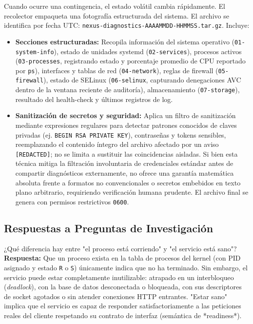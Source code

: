\documentclass[10pt,a4paper]{article}
\begin{document}
Cuando ocurre una contingencia, el estado volátil cambia rápidamente. El recolector empaqueta una fotografía estructurada del sistema. El archivo se identifica por fecha UTC: \nolinkurl{nexus-diagnostics-AAAAMMDD-HHMMSS.tar.gz}. Incluye:
\begin{itemize}[leftmargin=*]
    \item \textbf{Secciones estructuradas:} Recopila información del sistema operativo (\texttt{01-system-info}), estado de unidades systemd (\texttt{02-services}), procesos activos (\texttt{03-processes}, registrando estado y porcentaje promedio de CPU reportado por \texttt{ps}), interfaces y tablas de red (\texttt{04-network}), reglas de firewall (\texttt{05-firewall}), estado de SELinux (\texttt{06-selinux}, capturando denegaciones AVC dentro de la ventana reciente de auditoría), almacenamiento (\texttt{07-storage}), resultado del health-check y últimos registros de log.
    \item \textbf{Sanitización de secretos y seguridad:} Aplica un filtro de sanitización mediante expresiones regulares para detectar patrones conocidos de claves privadas (ej. \texttt{BEGIN RSA PRIVATE KEY}), contraseñas y tokens sensibles, reemplazando el contenido íntegro del archivo afectado por un aviso \texttt{[REDACTED]}; no se limita a sustituir las coincidencias aisladas. Si bien esta técnica mitiga la filtración involuntaria de credenciales estándar antes de compartir diagnósticos externamente, no ofrece una garantía matemática absoluta frente a formatos no convencionales o secretos embebidos en texto plano arbitrario, requiriendo verificación humana prudente. El archivo final se genera con permisos restrictivos \texttt{0600}.
\end{itemize}

\subsection{Respuestas a Preguntas de Investigación}

\begin{pregunta}{¿Qué diferencia hay entre "el proceso está corriendo" y "el servicio está sano"?}
    \textbf{Respuesta:} Que un proceso exista en la tabla de procesos del kernel (con PID asignado y estado \texttt{R} o \texttt{S}) únicamente indica que no ha terminado. Sin embargo, el servicio puede estar completamente inutilizable: atrapado en un interbloqueo (\textit{deadlock}), con la base de datos desconectada o bloqueada, con sus descriptores de socket agotados o sin atender conexiones HTTP entrantes. "Estar sano" implica que el servicio es capaz de responder satisfactoriamente a las peticiones reales del cliente respetando su contrato de interfaz (semántica de *readiness*).
\end{pregunta}
\end{document}
